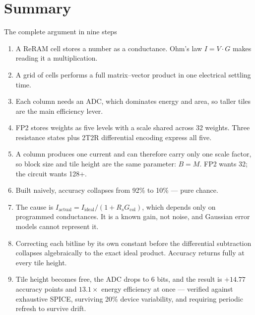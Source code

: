 \documentclass[11pt,a4paper]{report}
\begin{document}
\chapter{Summary}

\begin{keybox}{The complete argument in nine steps}
\begin{enumerate}[leftmargin=1.4em,itemsep=3pt]
  \item A ReRAM cell stores a number as a conductance. Ohm's law
        $I = V\!\cdot\!G$ makes reading it a multiplication.
  \item A grid of cells performs a full matrix--vector product in one
        electrical settling time.
  \item Each column needs an ADC, which dominates energy and area, so taller
        tiles are the main efficiency lever.
  \item FP2 stores weights as five levels with a scale shared across 32
        weights. Three resistance states plus 2T2R differential encoding
        express all five.
  \item A column produces one current and can therefore carry only one scale
        factor, so block size and tile height are the same parameter:
        $B = M$. FP2 wants 32; the circuit wants 128+.
  \item Built naively, accuracy collapses from 92\% to 10\% --- pure chance.
  \item The cause is $I_{\text{actual}} = I_{\text{ideal}}/(1 + R_s
        G_{\mathrm{col}})$, which depends only on programmed conductances.
        It is a known gain, not noise, and Gaussian error models cannot
        represent it.
  \item Correcting each bitline by its own constant before the differential
        subtraction collapses algebraically to the exact ideal product.
        Accuracy returns fully at every tile height.
  \item Tile height becomes free, the ADC drops to 6 bits, and the result is
        $+14.77$ accuracy points and $13.1\times$ energy efficiency at once ---
        verified against exhaustive SPICE, surviving 20\% device variability,
        and requiring periodic refresh to survive drift.
\end{enumerate}
\end{keybox}

\vspace{1em}
\end{document}
